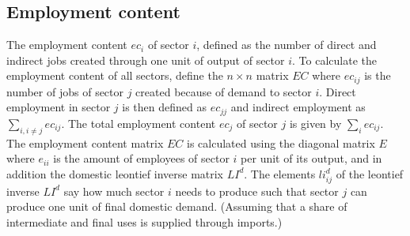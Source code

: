 \documentclass[12pt,english]{article}
\begin{document}
%




\subsection{Employment content}

The employment content $ec_i$ of sector $i$, defined as the number of direct and indirect jobs created through one unit of output of sector $i$. To calculate the employment content of all sectors, define the $n \times n$ matrix $EC$ where $ec_{ij}$  is the number of jobs of sector $j$ created because of demand to sector $i$. Direct employment in sector $j$ is then defined as $ec_{jj}$ and indirect employment as $\sum_{i, i\neq j} ec_{ij}$. The total employment content $ec_j$ of sector $j$ is given by $\sum_i ec_{ij}$. The employment content matrix $EC$ is calculated using the diagonal matrix $E$ where $e_{ii}$ is the amount of employees of sector $i$ per unit of its output, and in addition the domestic leontief inverse matrix $LI^d$. The elements $li_{ij}^d$ of the leontief inverse $LI^d$ say how much sector $i$ needs to produce such that sector $j$ can produce one unit of final domestic demand. (Assuming that a share of intermediate and final uses is supplied through imports.)
\end{document}

